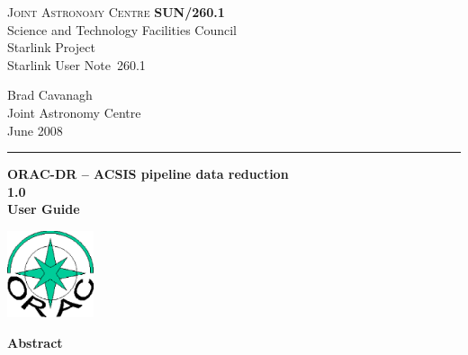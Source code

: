\documentclass[twoside,11pt]{article}
\newcommand{\stardoccategory}  {Starlink User Note}
\newcommand{\stardocinitials}  {SUN}
\newcommand{\stardocnumber}    {260.1}
\newcommand{\stardocauthors}   {Brad Cavanagh \\
                                Joint Astronomy Centre}
\newcommand{\stardocdate}      {June 2008}
\newcommand{\stardoctitle}     {ORAC-DR -- ACSIS pipeline data reduction}
\newcommand{\stardocversion}   {1.0}
\newcommand{\stardocmanual}    {User Guide}
\newcommand{\stardocname}{\stardocinitials /\stardocnumber}
\newenvironment{latexonly}{}{}
\renewcommand{\_}{\texttt{\symbol{95}}}
\begin{document}
\setcounter{secnumdepth}{5}
\thispagestyle{empty}

\begin{latexonly}
   \textsc{Joint Astronomy Centre} \hfill \textbf{\stardocname}\\
   {\large Science and Technology Facilities Council}\\
   {\large Starlink Project\\ }
   {\large \stardoccategory\ \stardocnumber}
   \begin{flushright}
   \stardocauthors\\
   \stardocdate
   \end{flushright}
   \vspace{-4mm}
   \rule{\textwidth}{0.5mm}
   \vspace{5mm}
   \begin{center}
   {\Huge\textbf{\stardoctitle \\ [2.5ex]}}
   {\LARGE\textbf{\stardocversion \\ [4ex]}}
   {\Huge\textbf{\stardocmanual}}
   \end{center}
   \vspace{5mm}

\begin{center}
\includegraphics[width=1.0in]{sun260_logo.eps}
\end{center}

   \vspace{10mm}
   \begin{center}
      {\Large\textbf{Abstract}}
   \end{center}
\end{latexonly}
\end{document}

